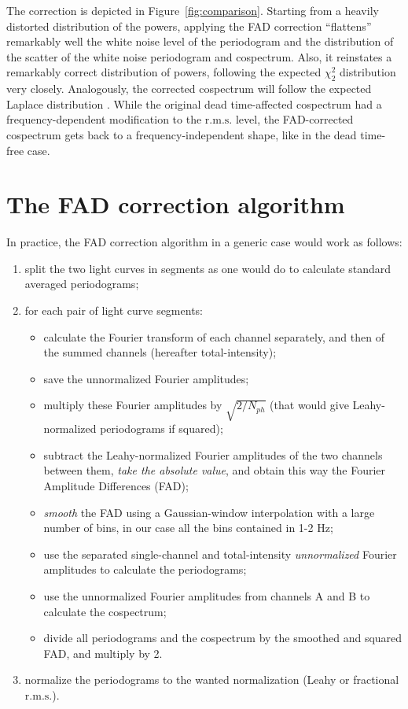 \documentclass[twocolumn]{aastex61}
\newcommand{\rms}{\ensuremath{\mathrm{r.m.s.}}\xspace}
\begin{document}
The correction is depicted in Figure~\ref{fig:comparison}. 
Starting from a heavily distorted distribution of the powers, applying the FAD correction ``flattens'' remarkably well the white noise level of the periodogram and the distribution of the scatter of the white noise periodogram and cospectrum. 
Also, it reinstates a remarkably correct distribution of powers, following the expected $\chi^2_2$ distribution \citep{Lewin+88} very closely. 
Analogously, the corrected cospectrum will follow the expected Laplace distribution \citep{Huppenkothen & Bachetti, sub.}.
While the original dead time-affected cospectrum had a frequency-dependent modification to the \rms level, the FAD-corrected cospectrum gets back to a frequency-independent shape, like in the dead time-free case.


\section{The FAD correction algorithm} \label{sec:fad}
In practice, the FAD correction algorithm in a generic case would work as follows:
\begin{enumerate}
\item split the two light curves in segments as one would do to calculate standard averaged periodograms;
\item for each pair of light curve segments: 
	\begin{itemize}
	\item calculate the Fourier transform of each channel separately, and then of the summed channels (hereafter total-intensity);
	\item save the unnormalized Fourier amplitudes;
	\item multiply these Fourier amplitudes by $\sqrt{2/N_{ph}}$ (that would give Leahy-normalized periodograms if squared);
	\item subtract the Leahy-normalized Fourier amplitudes of the two channels between them, \textit{take the absolute value}, and obtain this way the Fourier Amplitude Differences (FAD);
	\item \textit{smooth} the FAD using a Gaussian-window interpolation with a large number of bins, in our case all the bins contained in 1-2 Hz;
	\item use the separated single-channel and total-intensity \textit{unnormalized} Fourier amplitudes to calculate the periodograms;
	\item use the unnormalized Fourier amplitudes from channels A and B to calculate the cospectrum;
	\item divide all periodograms and the cospectrum by the smoothed and squared FAD, and multiply by 2.
	\end{itemize}
\item normalize the periodograms to the wanted normalization (Leahy or fractional \rms).
\end{enumerate}
\end{document}
